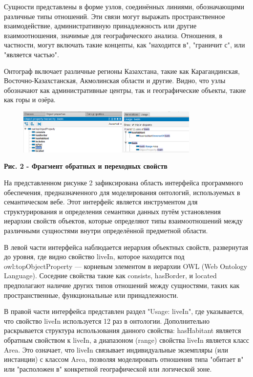 Сущности представлены в форме узлов, соединённых линиями, обозначающими
различные типы отношений. Эти связи могут выражать пространственное
взаимодействие, административную принадлежность или другие
взаимоотношения, значимые для географического анализа. Отношения, в
частности, могут включать такие концепты, как "находится в", "граничит
с", или "является частью".

Онтограф включает различные регионы Казахстана, такие как
Карагандинская, Восточно-Казахстанская, Акмолинская области и другие.
Видно, что узлы обозначают как административные центры, так и
географические объекты, такие как горы и озёра.

\begin{figure}[H]
	\centering
	\includegraphics[width=0.8\textwidth]{assets/39}
	\caption*{}
\end{figure}

\textbf{Рис. 2 - Фрагмент обратных и переходных свойств}

На представленном рисунке 2 зафиксирована область интерфейса
программного обеспечения, предназначенного для моделирования онтологий,
используемых в семантическом вебе. Этот интерфейс является инструментом
для структурирования и определения семантики данных путём установления
иерархии свойств объектов, которые определяют типы взаимоотношений между
различными сущностями внутри определённой предметной области.

В левой части интерфейса наблюдается иерархия объектных свойств,
развернутая до уровня, где видно свойство
\textquotesingle liveIn\textquotesingle, которое находится под
\textquotesingle owl:topObjectProperty\textquotesingle{} --- корневым
элементом в иерархии OWL (Web Ontology Language). Соседние свойства
такие как \textquotesingle consists\textquotesingle,
\textquotesingle hasBorder\textquotesingle, и
\textquotesingle located\textquotesingle{} предполагают наличие других
типов отношений между сущностями, таких как пространственные,
функциональные или принадлежности.

В правой части интерфейса представлен раздел "Usage: liveIn", где
указывается, что свойство \textquotesingle liveIn\textquotesingle{}
используется 12 раз в онтологии. Дополнительно раскрывается структура
использования данного свойства:
\textquotesingle hasHabitant\textquotesingle{} является обратным
свойством к \textquotesingle liveIn\textquotesingle, а диапазоном
(range) свойства \textquotesingle liveIn\textquotesingle{} является
класс \textquotesingle Area\textquotesingle. Это означает, что
\textquotesingle liveIn\textquotesingle{} связывает индивидуальные
экземпляры (или инстанции) с классом
\textquotesingle Area\textquotesingle, позволяя моделировать отношения
типа "обитает в" или "расположен в" конкретной географической или
логической зоне.

